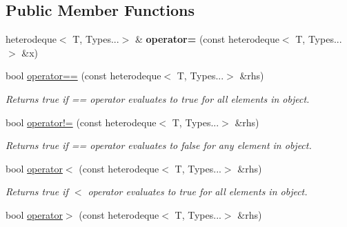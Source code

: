 \subsection*{Public Member Functions}
\begin{DoxyCompactItemize}
\item 
\hypertarget{classheterogeneous_1_1heterodeque_3_01_t_00_01_types_8_8_8_4_abb0ae4f658be0ad19fc5b5c4a69a861f}{}heterodeque$<$ T, Types...$>$ \& {\bfseries operator=} (const heterodeque$<$ T, Types...$>$ \&x)\label{classheterogeneous_1_1heterodeque_3_01_t_00_01_types_8_8_8_4_abb0ae4f658be0ad19fc5b5c4a69a861f}

\item 
\hypertarget{classheterogeneous_1_1heterodeque_3_01_t_00_01_types_8_8_8_4_aaefe615f6a78c480091ee3ecdbede47c}{}bool \hyperlink{classheterogeneous_1_1heterodeque_3_01_t_00_01_types_8_8_8_4_aaefe615f6a78c480091ee3ecdbede47c}{operator==} (const heterodeque$<$ T, Types...$>$ \&rhs)\label{classheterogeneous_1_1heterodeque_3_01_t_00_01_types_8_8_8_4_aaefe615f6a78c480091ee3ecdbede47c}

\begin{DoxyCompactList}\small\item\em Returns true if == operator evaluates to true for all elements in object. \end{DoxyCompactList}\item 
\hypertarget{classheterogeneous_1_1heterodeque_3_01_t_00_01_types_8_8_8_4_a54d5fda97c67da81ac0f267e00351887}{}bool \hyperlink{classheterogeneous_1_1heterodeque_3_01_t_00_01_types_8_8_8_4_a54d5fda97c67da81ac0f267e00351887}{operator!=} (const heterodeque$<$ T, Types...$>$ \&rhs)\label{classheterogeneous_1_1heterodeque_3_01_t_00_01_types_8_8_8_4_a54d5fda97c67da81ac0f267e00351887}

\begin{DoxyCompactList}\small\item\em Returns true if == operator evaluates to false for any element in object. \end{DoxyCompactList}\item 
\hypertarget{classheterogeneous_1_1heterodeque_3_01_t_00_01_types_8_8_8_4_ae3a8ce4dbed0dc5714cd0f10ba121c56}{}bool \hyperlink{classheterogeneous_1_1heterodeque_3_01_t_00_01_types_8_8_8_4_ae3a8ce4dbed0dc5714cd0f10ba121c56}{operator$<$} (const heterodeque$<$ T, Types...$>$ \&rhs)\label{classheterogeneous_1_1heterodeque_3_01_t_00_01_types_8_8_8_4_ae3a8ce4dbed0dc5714cd0f10ba121c56}

\begin{DoxyCompactList}\small\item\em Returns true if $<$ operator evaluates to true for all elements in object. \end{DoxyCompactList}\item 
\hypertarget{classheterogeneous_1_1heterodeque_3_01_t_00_01_types_8_8_8_4_a2d78e8eba482e3679dcbdc61f7999060}{}bool \hyperlink{classheterogeneous_1_1heterodeque_3_01_t_00_01_types_8_8_8_4_a2d78e8eba482e3679dcbdc61f7999060}{operator$>$} (const heterodeque$<$ T, Types...$>$ \&rhs)\label{classheterogeneous_1_1heterodeque_3_01_t_00_01_types_8_8_8_4_a2d78e8eba482e3679dcbdc61f7999060}


\end{DoxyCompactItemize}

